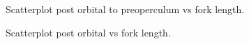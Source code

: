 \documentclass[12pt]{article}\usepackage[]{graphicx}\usepackage[]{color}
\begin{document}
\begin{figure}[htb]

{\centering {} 

}

\caption{Scatterplot post orbital to preoperculum vs fork length.}\label{fig:figure7}
\end{figure}

\begin{figure}[htb]

{\centering {} 

}

\caption{Scatterplot post orbital vs fork length.}\label{fig:figure8}
\end{figure}
\clearpage
\end{document}
